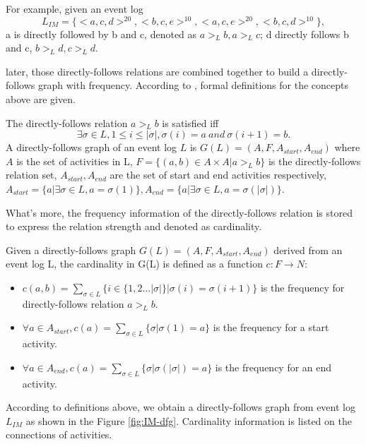 For example, given an event log \[L_{IM}=\{<a,c,d>^{20},<b,c,e>^{10},<a,c,e>^{20},<b,c,d>^{10}\},\] 
a is directly followed by b and c, denoted as $a >_L b, a>_L c$; d directly follows b and c, $b>_L d, c>_L d$.

later, those directly-follows relations are combined together to build a directly-follows graph with frequency. According to \cite{van2016data, leemans2013discovering}, formal definitions for the concepts above are given.
\begin{definition}
 The directly-follows relation $a >_L b$ is satisfied iff \[\exists\sigma \in L, 1 \leq i \leq \vert \sigma \vert , \sigma(i)=a \ and \ \sigma(i+1)=b.\]
 A directly-follows graph of an event log $L$ is $G(L) = (A, F , A_{start}, A_{end}) $ where $A$ is the set of activities in L, $ F=\{ (a,b) \in A \times A | a >_L b \} $ is the directly-follows relation set, $A_{start}, A_{end}$ are the set of start and end activities respectively, $A_{start}=\{a\vert \exists \sigma \in L, a=\sigma(1)\}, A_{end}=\{a\vert \exists \sigma \in L, a=\sigma(\vert \sigma\vert)\}$.
\end{definition}
What's more, the frequency information of the directly-follows relation is stored to express the relation strength and denoted as cardinality. 
\begin{definition}
Given a directly-follows graph $G(L)=(A, F , A_{start}, A_{end})$ derived from an event log L, the cardinality in G(L) is defined as a function $c: F \rightarrow N$:  
	\begin{itemize}
		\itemsep0em
		\item $c(a,b)=\sum_{\sigma \in L} \{ i\in \{1,2...|\sigma|\} \vert \sigma(i)=\sigma(i+1)\} $ is the frequency for directly-follows relation $a>_L b$. 
		\item $\forall a \in A_{start}, c(a)=\sum_{\sigma \in L} \{\sigma \vert \sigma(1) = a\}$ is the frequency for a start activity.
		\item $\forall a \in A_{end}, c(a)=\sum_{\sigma \in L} \{\sigma \vert \sigma(|\sigma|) = a\}$ is the frequency for an end activity.
	\end{itemize}	
\end{definition}
According to definitions above, we obtain a directly-follows graph from event log $L_{IM}$ as shown in the Figure \ref{fig:IM-dfg}. Cardinality information is listed on the connections of activities.
